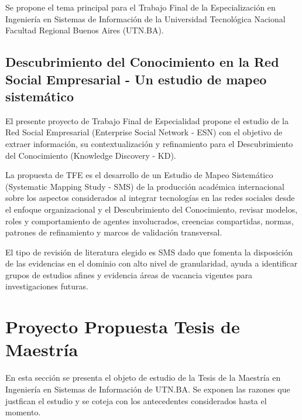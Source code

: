 \documentclass[a4paper,fleqn,spanish]{cas-dc}
\begin{document}
Se propone el tema principal para el Trabajo Final de la Especialización en
Ingeniería en Sistemas de Información de la Universidad Tecnológica Nacional
Facultad Regional Buenos Aires (UTN.BA).

\subsection{Descubrimiento del Conocimiento en la Red Social Empresarial - Un estudio de mapeo sistemático}\label{titulo-TFE}

El presente proyecto de Trabajo Final de Especialidad propone el estudio de la
Red Social Empresarial (Enterprise Social Network - ESN) con el objetivo de
extraer información, su contextualización y refinamiento para el Descubrimiento
del Conocimiento (Knowledge Discovery - KD).

La propuesta de TFE es el desarrollo de un Estudio de Mapeo Sistemático
(Systematic Mapping Study - SMS) de la producción académica internacional sobre
los aspectos considerados al integrar tecnologías en las redes sociales desde
el enfoque organizacional y el Descubrimiento del Conocimiento, revisar
modelos, roles y comportamiento de agentes involucrados, creencias compartidas,
normas, patrones de refinamiento y marcos de validación transversal.

El tipo de revisión de literatura elegido es SMS dado que fomenta la
disposición de las evidencias en el dominio con alto nivel de granularidad,
ayuda a identificar grupos de estudios afines y evidencia áreas de vacancia
vigentes para investigaciones futuras.


\section{Proyecto Propuesta Tesis de Maestría}\label{tesis}

En esta sección se presenta el objeto de estudio de la Tesis de la Maestría en
Ingeniería en Sistemas de Información de UTN.BA. Se exponen las razones que
justfican el estudio y se coteja con los antecedentes considerados hasta el
momento.
\end{document}
